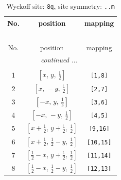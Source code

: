 \documentclass[fleqn,8pt]{jsarticle}
\begin{document}
\begin{longtable}{ccc}
\caption{Wyckoff site: {\tt 8q}, site symmetry: {\tt ..m}}
 \\
 \hline \hline
No. & position & mapping \\ \hline \endfirsthead

\multicolumn{2}{l}{\tablename\ \thetable{}} \\
 \hline \hline
No. & position & mapping \\ \hline \endhead

 \hline \hline
\multicolumn{2}{r}{\footnotesize\it continued ...} \\ \endfoot

 \hline \hline
\multicolumn{2}{r}{} \\ \endlastfoot

1 & $\left[ x,\, y,\, \frac{1}{2} \right]$ & {\tt [1,8]} \\ \hline
2 & $\left[ x,\, - y,\, \frac{1}{2} \right]$ & {\tt [2,7]} \\ \hline
3 & $\left[ - x,\, y,\, \frac{1}{2} \right]$ & {\tt [3,6]} \\ \hline
4 & $\left[ - x,\, - y,\, \frac{1}{2} \right]$ & {\tt [4,5]} \\ \hline
5 & $\left[ x + \frac{1}{2},\, y + \frac{1}{2},\, \frac{1}{2} \right]$ & {\tt [9,16]} \\ \hline
6 & $\left[ x + \frac{1}{2},\, \frac{1}{2} - y,\, \frac{1}{2} \right]$ & {\tt [10,15]} \\ \hline
7 & $\left[ \frac{1}{2} - x,\, y + \frac{1}{2},\, \frac{1}{2} \right]$ & {\tt [11,14]} \\ \hline
8 & $\left[ \frac{1}{2} - x,\, \frac{1}{2} - y,\, \frac{1}{2} \right]$ & {\tt [12,13]} \\
\end{longtable}
\renewcommand{\arraystretch}{1.2}
\end{document}
